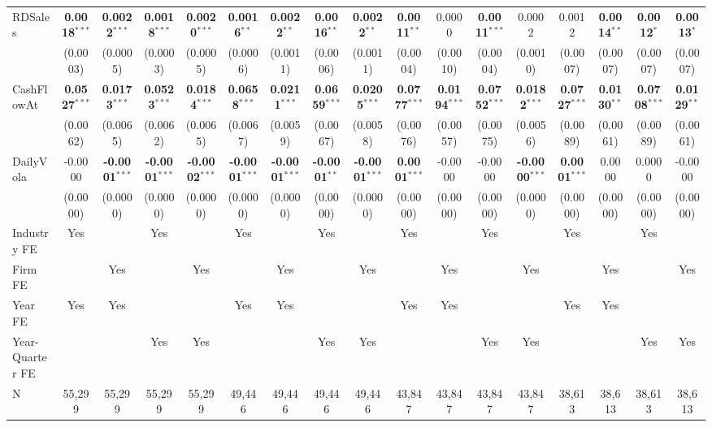 \documentclass[11pt,a4paper]{article}
\begin{document}
\begin{table}[htbp]
\begin{tabular}{lcccccccccccccccc}
RDSales & \textbf{0.0018}$^{***}$ & \textbf{0.0022}$^{***}$ & \textbf{0.0018}$^{***}$ & \textbf{0.0020}$^{***}$ & \textbf{0.0016}$^{**}$ & \textbf{0.0022}$^{**}$ & \textbf{0.0016}$^{**}$ & \textbf{0.0022}$^{**}$ & \textbf{0.0011}$^{**}$ & 0.0000 & \textbf{0.0011}$^{***}$ & 0.0002 & 0.0012 & \textbf{0.0014}$^{**}$ & \textbf{0.0012}$^{*}$ & \textbf{0.0013}$^{*}$ \\
 & (0.0003) & (0.0005) & (0.0003) & (0.0005) & (0.0006) & (0.0011) & (0.0006) & (0.0011) & (0.0004) & (0.0010) & (0.0004) & (0.0010) & (0.0007) & (0.0007) & (0.0007) & (0.0007) \\
CashFlowAt & \textbf{0.0527}$^{***}$ & \textbf{0.0173}$^{***}$ & \textbf{0.0523}$^{***}$ & \textbf{0.0184}$^{***}$ & \textbf{0.0658}$^{***}$ & \textbf{0.0211}$^{***}$ & \textbf{0.0659}$^{***}$ & \textbf{0.0205}$^{***}$ & \textbf{0.0777}$^{***}$ & \textbf{0.0194}$^{***}$ & \textbf{0.0752}$^{***}$ & \textbf{0.0182}$^{***}$ & \textbf{0.0727}$^{***}$ & \textbf{0.0130}$^{**}$ & \textbf{0.0708}$^{***}$ & \textbf{0.0129}$^{**}$ \\
 & (0.0062) & (0.0065) & (0.0062) & (0.0065) & (0.0067) & (0.0059) & (0.0067) & (0.0058) & (0.0076) & (0.0057) & (0.0075) & (0.0056) & (0.0089) & (0.0061) & (0.0089) & (0.0061) \\
DailyVola & -0.0000 & \textbf{-0.0001}$^{***}$ & \textbf{-0.0001}$^{***}$ & \textbf{-0.0002}$^{***}$ & \textbf{-0.0001}$^{***}$ & \textbf{-0.0001}$^{***}$ & \textbf{-0.0001}$^{**}$ & \textbf{-0.0001}$^{***}$ & \textbf{0.0001}$^{***}$ & -0.0000 & -0.0000 & \textbf{-0.0000}$^{***}$ & \textbf{0.0001}$^{***}$ & 0.0000 & 0.0000 & -0.0000 \\
 & (0.0000) & (0.0000) & (0.0000) & (0.0000) & (0.0000) & (0.0000) & (0.0000) & (0.0000) & (0.0000) & (0.0000) & (0.0000) & (0.0000) & (0.0000) & (0.0000) & (0.0000) & (0.0000) \\
\midrule
Industry FE & Yes &  & Yes &  & Yes &  & Yes &  & Yes &  & Yes &  & Yes &  & Yes &  \\
Firm FE &  & Yes &  & Yes &  & Yes &  & Yes &  & Yes &  & Yes &  & Yes &  & Yes \\
Year FE & Yes & Yes &  &  & Yes & Yes &  &  & Yes & Yes &  &  & Yes & Yes &  &  \\
Year-Quarter FE &  &  & Yes & Yes &  &  & Yes & Yes &  &  & Yes & Yes &  &  & Yes & Yes \\
\midrule
N & 55,299 & 55,299 & 55,299 & 55,299 & 49,446 & 49,446 & 49,446 & 49,446 & 43,847 & 43,847 & 43,847 & 43,847 & 38,613 & 38,613 & 38,613 & 38,613 \\

\end{tabular}
\end{table}
\end{document}

